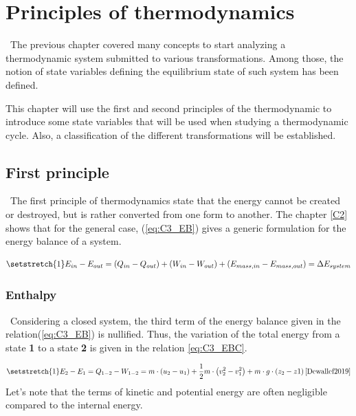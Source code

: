 \graphicspath{{Chapitre_3/Images/}}
\chapter{Principles of thermodynamics}\label{C3}
\quad\ The previous chapter covered many concepts to start analyzing a thermodynamic system submitted to various transformations. Among those, the notion of state variables defining the equilibrium state of such system has been defined. 

This chapter will use the first and second principles of the thermodynamic to introduce some state variables that will be used when studying a thermodynamic cycle. Also, a classification of the different transformations will be established.
\section{First principle}
\quad\ The first principle of thermodynamics state that the energy cannot be created or destroyed, but is rather converted from one form to another.
The chapter \ref{C2} shows that for the general case, (\ref{eq:C3_EB}) gives a generic formulation for the energy balance of a system. 

\begin{equation}
  \setstretch{1}
  E_{in} - E_{out} = (Q_{in} - Q_{out}) + (W_{in} - W_{out}) + (E_{mass,in} - E_{mass,out}) = \Delta E_{system} \label{eq:C3_EB}
\end{equation}
\subsection{Enthalpy}
\quad\ Considering a closed system, the third term of the energy balance given in the relation(\ref{eq:C3_EB}) is nullified. Thus, the variation of the total energy from a state \textbf{1} to a state \textbf{2} is given in the relation \ref{eq:C3_EBC}.

\begin{equation}
\setstretch{1}
E_{2} - E_{1} = Q_{1-2} - W_{1-2} = m\cdot\left(u_2 - u_1\right) + \frac{1}{2}m\cdot\left(v^2_2 - v^2_1\right) + m\cdot g\cdot\left(z_2 - z1\right)\citep{Dewallef2019} \label{eq:C3_EBC}
\end{equation}
Let’s note that the terms of kinetic and potential energy are often negligible compared to the internal energy.  

